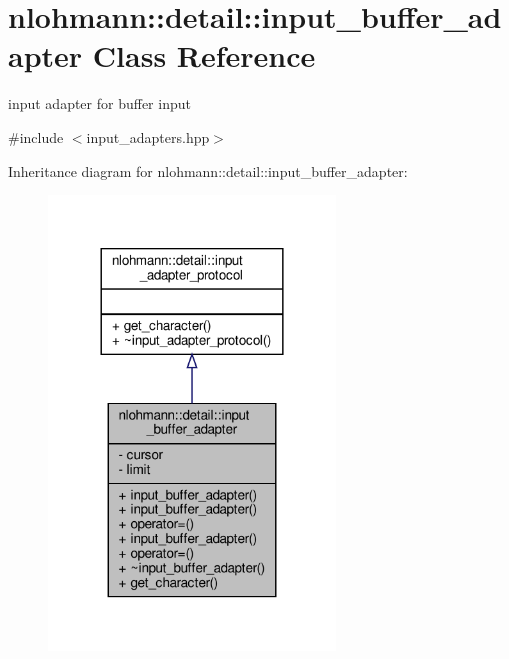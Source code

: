 \hypertarget{classnlohmann_1_1detail_1_1input__buffer__adapter}{}\section{nlohmann\+:\+:detail\+:\+:input\+\_\+buffer\+\_\+adapter Class Reference}
\label{classnlohmann_1_1detail_1_1input__buffer__adapter}


input adapter for buffer input  




{\ttfamily \#include $<$input\+\_\+adapters.\+hpp$>$}



Inheritance diagram for nlohmann\+:\+:detail\+:\+:input\+\_\+buffer\+\_\+adapter\+:
\nopagebreak
\begin{figure}[H]
\begin{center}
\leavevmode
\includegraphics[width=216pt]{classnlohmann_1_1detail_1_1input__buffer__adapter__inherit__graph}
\end{center}
\end{figure}


